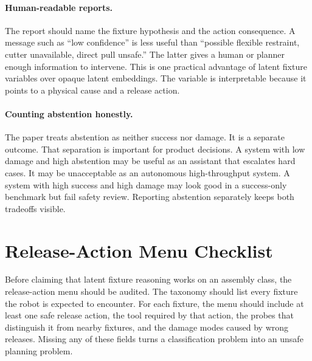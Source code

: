 \documentclass{article}
\begin{document}
\paragraph{Human-readable reports.}
The report should name the fixture hypothesis and the action consequence. A
message such as ``low confidence'' is less useful than ``possible flexible
restraint, cutter unavailable, direct pull unsafe.'' The latter gives a human
or planner enough information to intervene. This is one practical advantage of
latent fixture variables over opaque latent embeddings. The variable is
interpretable because it points to a physical cause and a release action.

\paragraph{Counting abstention honestly.}
The paper treats abstention as neither success nor damage. It is a separate
outcome. That separation is important for product decisions. A system with low
damage and high abstention may be useful as an assistant that escalates hard
cases. It may be unacceptable as an autonomous high-throughput system. A
system with high success and high damage may look good in a success-only
benchmark but fail safety review. Reporting abstention separately keeps both
tradeoffs visible.

\section{Release-Action Menu Checklist}

Before claiming that latent fixture reasoning works on an assembly class, the
release-action menu should be audited. The taxonomy should list every fixture
the robot is expected to encounter. For each fixture, the menu should include
at least one safe release action, the tool required by that action, the probes
that distinguish it from nearby fixtures, and the damage modes caused by
wrong releases. Missing any of these fields turns a classification problem
into an unsafe planning problem.
\end{document}
